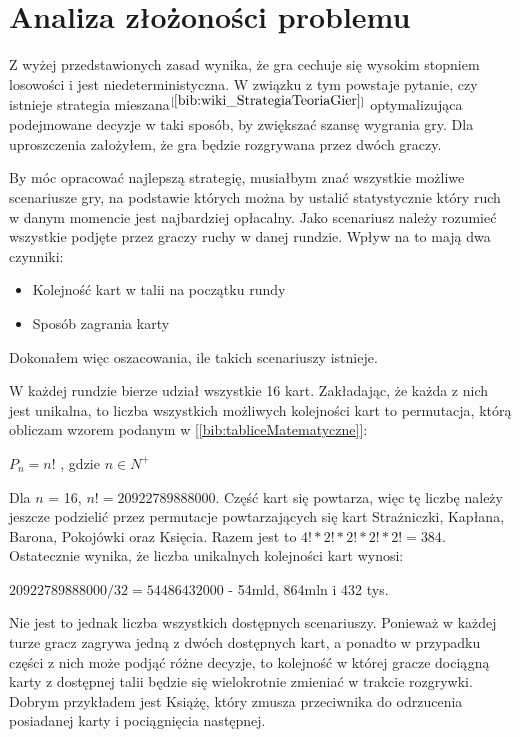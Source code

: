 \section{Analiza złożoności problemu}
\label{sec:opisProblemu}
Z wyżej przedstawionych zasad wynika, że gra cechuje się wysokim stopniem losowości i jest niedeterministyczna. W związku z tym powstaje pytanie, czy istnieje strategia mieszana$^{[\ref{bib:wiki_StrategiaTeoriaGier}]}$ optymalizująca podejmowane decyzje w taki sposób, by zwiększać szansę wygrania gry. Dla uproszczenia założyłem, że gra będzie rozgrywana przez dwóch graczy.

By móc opracować najlepszą strategię, musiałbym znać wszystkie możliwe scenariusze gry, na podstawie których można by ustalić statystycznie który ruch w danym momencie jest najbardziej opłacalny. Jako scenariusz należy rozumieć wszystkie podjęte przez graczy ruchy w danej rundzie. Wpływ na to mają dwa czynniki:
\begin{itemize}
	\item Kolejność kart w talii na początku rundy
	\item Sposób zagrania karty
\end{itemize}
Dokonałem więc oszacowania, ile takich scenariuszy istnieje. 

W każdej rundzie bierze udział wszystkie 16 kart. Zakładając, że każda z nich jest unikalna, to  liczba wszystkich możliwych kolejności kart to permutacja, którą obliczam wzorem podanym w [\ref{bib:tabliceMatematyczne}]:

\begin{center}
	$P_n = n!$ , gdzie $n\in N^+$
\end{center}

Dla  $n$ = 16, $n!=20 922 789 888 000$. Część kart się powtarza, więc tę liczbę należy jeszcze podzielić przez permutacje powtarzających się kart Strażniczki, Kapłana, Barona, Pokojówki oraz Księcia. Razem jest to $4! * 2! * 2! * 2! * 2! =  384$. Ostatecznie wynika, że liczba unikalnych kolejności kart wynosi: 

\begin{center}
	$20 922 789 888 000 / 32 = 54486432000$ - 54mld, 864mln i 432 tys.
\end{center}

Nie jest to jednak liczba wszystkich dostępnych scenariuszy. Ponieważ w każdej turze gracz zagrywa jedną z dwóch dostępnych kart, a ponadto w przypadku części z nich może podjąć różne decyzje, to kolejność w której gracze dociągną karty z dostępnej talii będzie się wielokrotnie zmieniać w trakcie rozgrywki. Dobrym przykładem jest Książę, który zmusza przeciwnika do odrzucenia posiadanej karty i pociągnięcia następnej. 

